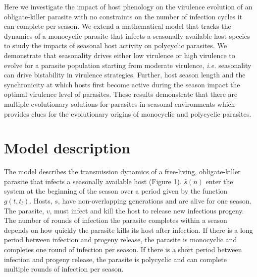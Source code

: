\documentclass{article}
\begin{document}
Here we investigate the impact of host phenology on the virulence evolution of an obligate-killer parasite with no constraints on the number of infection cycles it can complete per season. We extend a mathematical model that tracks the dynamics of a monocyclic parasite that infects a seasonally available host species to study the impacts of seasonal host activity on polycyclic parasites. We demonstrate that seasonality drives either low virulence or high virulence to evolve for a parasite population starting from moderate virulence, \textit{i.e.} seasonality can drive bistability in virulence strategies. Further, host season length and the synchronicity at which hosts first become active during the season impact the optimal virulence level of parasites. These results demonstrate that there are multiple evolutionary solutions for parasites in seasonal environments which provides clues for the evolutionary origins of monocyclic and polycyclic parasites.

\section{Model description}
The model describes the transmission dynamics of a free-living, obligate-killer parasite that infects a seasonally available host (Figure 1). $\hat{s}(n)$ enter the system at the beginning of the season over a period given by the function $g(t,t_{l})$. Hosts, $s$, have non-overlapping generations and are alive for one season. 
The parasite, $v$, must infect and kill the host to release new infectious progeny. The number of rounds of infection the parasite completes within a season depends on how quickly the parasite kills its host after infection. If there is a long period between infection and progeny release, the parasite is monocyclic and completes one round of infection per season. If there is a short period between infection and progeny release, the parasite is polycyclic and can complete multiple rounds of infection per season.
\end{document}
